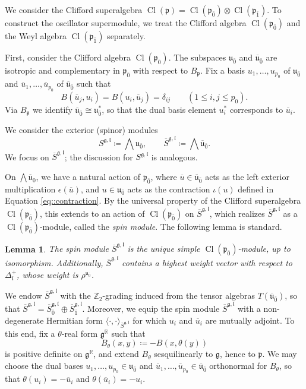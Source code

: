 \documentclass[11pt]{amsart}
\newcommand{\bracket}{{\langle \cdot,\cdot \rangle}}
\def\RR{{\mathbb R}}
\def\ubar{{\overline{\mathfrak{u}}}}
\def\Sbar{{\overline{S}}}
\def\spinbar{{\overline{S}^{\gg,\ll}}}
\def\spin{{S^{\gg,\ll}}}
\def\spinbar{{\overline{S}^{\gg,\ll}}}
\def\Cl{{\operatorname{Cl}}}
\def\pp{{\mathfrak p}}
\def\uu{{\mathfrak u}}
\def\ll{{\mathfrak l}}
\def\pp{{\mathfrak p}}
\def\pp{{\mathfrak{p}}}
\def\gg{{\mathfrak{g}}}
\def\ZZ{{\mathbb Z}}
\theoremstyle{plain}
\newtheorem{lemma}[theorem]{Lemma}
\theoremstyle{remark}
\theoremstyle{definition}
\numberwithin{equation}{section}
\theoremstyle{remark}
\begin{document}
We consider the Clifford superalgebra
$
\Cl(\pp)=\Cl(\pp_{\bar 0})\otimes \Cl(\pp_{\bar 1}).
$
To construct the oscillator supermodule, we treat the Clifford algebra $\Cl(\pp_{\bar 0})$ and the Weyl
algebra $\Cl(\pp_{\bar 1})$ separately.

First, consider the Clifford algebra $\Cl(\pp_{\bar 0})$. The subspaces $\uu_{\bar 0}$ and $\ubar_{\bar 0}$
are isotropic and complementary in $\pp_{\bar 0}$ with respect to $B_{\pp}$. Fix a basis
$u_{1},\dots,u_{p_0}$ of $\uu_{\bar 0}$ and $\overline{u}_{1},\dots,\overline{u}_{p_0}$ of $\ubar_{\bar 0}$ such that
\begin{equation}
B(\overline{u}_{j},u_{i})=B(u_{i},\overline{u}_{j})=\delta_{ij}\qquad (1\le i,j\le p_0).
\end{equation}
Via $B_{\pp}$ we identify $\ubar_{\bar 0}\cong \uu_{\bar 0}^{*}$, so that the dual basis element
$u_i^{*}$ corresponds to $\overline{u}_i$.

We consider the exterior (spinor) modules
\begin{equation} \label{eq::def_spinor_module}
\spin\coloneqq \bigwedge \uu_{\bar 0}, \qquad \spinbar\coloneqq \bigwedge \ubar_{\bar 0}.
\end{equation}
We focus on $\spinbar$; the discussion for $\spin$ is analogous.

On $\bigwedge \ubar_0$, we have a natural action of $\pp_{\bar{0}}$, where $\overline{u} \in \ubar_{\bar{0}}$ acts as the left exterior multiplication $\epsilon(\overline{u})$, and $u \in \uu_{\bar{0}}$ acts as the contraction $\iota(u)$ defined in Equation \eqref{eq::contraction}. By the universal property of the Clifford superalgebra $\Cl(\pp_{\bar{0}})$, this extends to an action of $\Cl(\pp_{\bar{0}})$ on $\spinbar$, which realizes $\spinbar$ as a $\Cl(\pp_{\bar{0}})$-module, called the \emph{spin module}. The following lemma is standard. 

\begin{lemma} \label{lemm::spin_simple}
 The spin module $\spinbar$ is the unique simple $\Cl(\pp_{\bar{0}})$-module, up to isomorphism. Additionally, $\spinbar$ contains a highest weight vector with respect to $\Delta_{\ll}^{+}$, whose weight is $\rho^{\uu_{\bar{0}}}$.
\end{lemma}

We endow $\spinbar$ with the $\ZZ_{2}$-grading induced from the tensor algebras $T(\ubar_{\bar{0}})$, so that $\spinbar=\Sbar^{\gg,\ll}_{\bar{0}}\oplus \Sbar^{\gg,\ll}_{\bar{1}}$. 
Moreover, we equip the spin module $\spinbar$ with a non-degenerate Hermitian form $\bracket_{\spinbar}$ for which
$u_i$ and $\overline{u}_i$ are mutually adjoint. To this end, fix a $\theta$-real form $\gg^{\RR}$ such that
\[
B_\theta(x,y)\coloneqq -B(x,\theta(y))
\]
is positive definite on $\gg^{\RR}$, and extend $B_\theta$ sesquilinearly to $\gg$, hence to $\pp$.
We may choose the dual bases $u_1,\dots,u_{p_0}\in \uu_{\bar 0}$ and $\overline{u}_1,\dots,\overline{u}_{p_0}\in \ubar_{\bar 0}$
orthonormal for $B_\theta$, so that $\theta(u_i)=-\overline{u}_i$ and $\theta(\overline{u}_i)=-u_i$.
\end{document}
